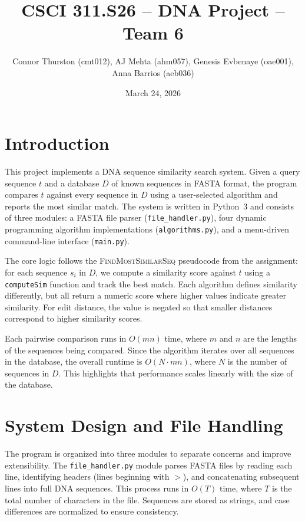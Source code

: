 \documentclass{article}
\title{CSCI 311.S26 -- DNA Project -- Team 6}
\author{Connor Thurston (cmt012), AJ Mehta (ahm057), Genesis Evbenaye (oae001), Anna Barrios (aeb036)}
\date{March 24, 2026}
\begin{document}
\maketitle

\section{Introduction}

This project implements a DNA sequence similarity search system. Given a query sequence $t$ and a database $D$ of known sequences in FASTA format, the program compares $t$ against every sequence in $D$ using a user-selected algorithm and reports the most similar match. The system is written in Python~3 and consists of three modules: a FASTA file parser (\texttt{file\_handler.py}), four dynamic programming algorithm implementations (\texttt{algorithms.py}), and a menu-driven command-line interface (\texttt{main.py}).

The core logic follows the \textsc{FindMostSimilarSeq} pseudocode from the assignment: for each sequence $s_i$ in $D$, we compute a similarity score against $t$ using a \texttt{computeSim} function and track the best match. Each algorithm defines similarity differently, but all return a numeric score where higher values indicate greater similarity. For edit distance, the value is negated so that smaller distances correspond to higher similarity scores.

Each pairwise comparison runs in $O(mn)$ time, where $m$ and $n$ are the lengths of the sequences being compared. Since the algorithm iterates over all sequences in the database, the overall runtime is $O(N \cdot m n)$, where $N$ is the number of sequences in $D$. This highlights that performance scales linearly with the size of the database.

\section{System Design and File Handling}

The program is organized into three modules to separate concerns and improve extensibility. The \texttt{file\_handler.py} module parses FASTA files by reading each line, identifying headers (lines beginning with $>$), and concatenating subsequent lines into full DNA sequences. This process runs in $O(T)$ time, where $T$ is the total number of characters in the file. Sequences are stored as strings, and case differences are normalized to ensure consistency.
\end{document}
